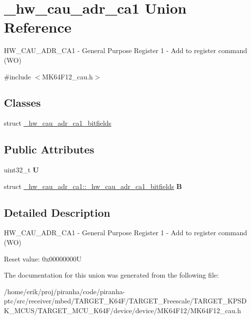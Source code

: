 \hypertarget{union__hw__cau__adr__ca1}{}\section{\+\_\+hw\+\_\+cau\+\_\+adr\+\_\+ca1 Union Reference}
\label{union__hw__cau__adr__ca1}


H\+W\+\_\+\+C\+A\+U\+\_\+\+A\+D\+R\+\_\+\+C\+A1 -\/ General Purpose Register 1 -\/ Add to register command (WO)  




{\ttfamily \#include $<$M\+K64\+F12\+\_\+cau.\+h$>$}

\subsection*{Classes}
\begin{DoxyCompactItemize}
\item 
struct \hyperlink{struct__hw__cau__adr__ca1_1_1__hw__cau__adr__ca1__bitfields}{\+\_\+hw\+\_\+cau\+\_\+adr\+\_\+ca1\+\_\+bitfields}
\end{DoxyCompactItemize}
\subsection*{Public Attributes}
\begin{DoxyCompactItemize}
\item 
uint32\+\_\+t {\bfseries U}\hypertarget{union__hw__cau__adr__ca1_abac235757c8cd480ed264dc6ff9d8396}{}\label{union__hw__cau__adr__ca1_abac235757c8cd480ed264dc6ff9d8396}

\item 
struct \hyperlink{struct__hw__cau__adr__ca1_1_1__hw__cau__adr__ca1__bitfields}{\+\_\+hw\+\_\+cau\+\_\+adr\+\_\+ca1\+::\+\_\+hw\+\_\+cau\+\_\+adr\+\_\+ca1\+\_\+bitfields} {\bfseries B}\hypertarget{union__hw__cau__adr__ca1_a405055ea873605388bb3219b214db691}{}\label{union__hw__cau__adr__ca1_a405055ea873605388bb3219b214db691}

\end{DoxyCompactItemize}


\subsection{Detailed Description}
H\+W\+\_\+\+C\+A\+U\+\_\+\+A\+D\+R\+\_\+\+C\+A1 -\/ General Purpose Register 1 -\/ Add to register command (WO) 

Reset value\+: 0x00000000U 

The documentation for this union was generated from the following file\+:\begin{DoxyCompactItemize}
\item 
/home/erik/proj/piranha/code/piranha-\/ptc/src/receiver/mbed/\+T\+A\+R\+G\+E\+T\+\_\+\+K64\+F/\+T\+A\+R\+G\+E\+T\+\_\+\+Freescale/\+T\+A\+R\+G\+E\+T\+\_\+\+K\+P\+S\+D\+K\+\_\+\+M\+C\+U\+S/\+T\+A\+R\+G\+E\+T\+\_\+\+M\+C\+U\+\_\+\+K64\+F/device/device/\+M\+K64\+F12/M\+K64\+F12\+\_\+cau.\+h\end{DoxyCompactItemize}

